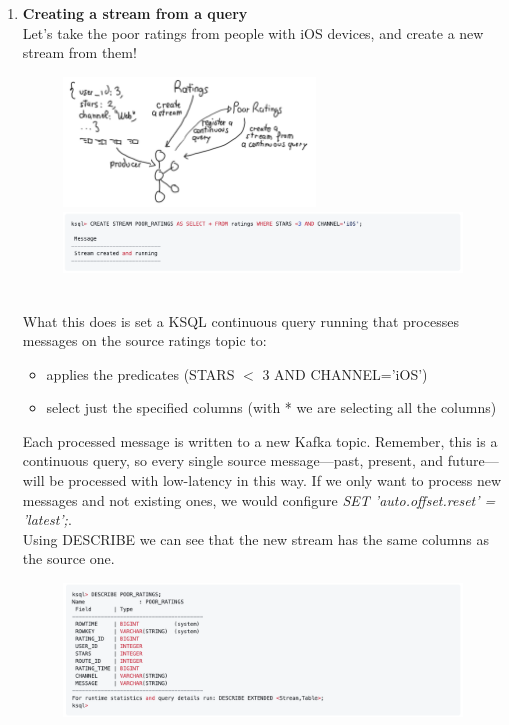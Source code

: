 \documentclass[10pt,a4paper]{article}
\begin{document}
\begin{enumerate}
 \pagebreak
 \item \textbf{Creating a stream from a query} \\
 Let’s take the poor ratings from people with iOS devices, and create a new stream from them!
 \begin{figure}[ht!]
 \hfill \includegraphics[width=190pt]{images/ksql-demo-4}\hspace*{\fill}
\vspace{0.1em} \center 
 \hfill \includegraphics[width=400pt]{images/ksql-cmd7}\hspace*{\fill} 
 \end{figure} \\
 What this does is set a KSQL continuous query running that processes messages on the source ratings topic to:
 \begin{itemize}
 	\item applies the predicates (STARS $<$ 3 AND CHANNEL='iOS')
 	\item select just the specified columns (with * we are selecting all the columns)
 \end{itemize}
 Each processed message is written to a new Kafka topic. Remember, this is a continuous query, so every single source message—past, present, and future—will be processed with low-latency in this way. If we only want to process new messages and not existing ones, we would configure \textit{SET 'auto.offset.reset' = 'latest';}. \\
 Using DESCRIBE we can see that the new stream has the same columns as the source one.
  \begin{figure}[ht!]
 \hfill \includegraphics[width=400pt]{images/ksql-cmd8}\hspace*{\fill} 

\end{figure}
\end{enumerate}
\end{document}
